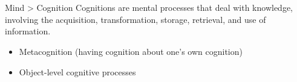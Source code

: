 \section{}
    \begin{frame}[allowframebreaks]{Mind > Cognition}
        Cognitions are mental processes that deal with knowledge, involving the acquisition, transformation, storage, retrieval, and use of information. \cite{revlin-2012-cognition-theory-and-practice}
        \begin{itemize}
            \item Metacognition (having cognition about one's own cognition)
            \item Object-level cognitive processes
        \end{itemize}
    \end{frame}

    \subsection{}
        
        
